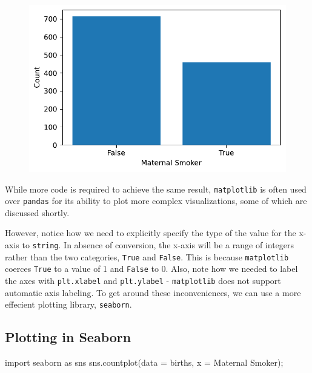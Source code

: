 \documentclass[
  letterpaper,
  DIV=11,
  numbers=noendperiod]{scrreprt}
\newenvironment{Shaded}{\begin{snugshade}}{\end{snugshade}}
\newcommand{\ImportTok}[1]{\textcolor[rgb]{0.00,0.46,0.62}{#1}}
\newcommand{\NormalTok}[1]{\textcolor[rgb]{0.00,0.23,0.31}{#1}}
\newcommand{\OperatorTok}[1]{\textcolor[rgb]{0.37,0.37,0.37}{#1}}
\newcommand{\StringTok}[1]{\textcolor[rgb]{0.13,0.47,0.30}{#1}}
\begin{document}
\begin{figure}[H]

{\centering \includegraphics{visualization_1/visualization_1_files/figure-pdf/cell-4-output-1.pdf}

}

\end{figure}

While more code is required to achieve the same result,
\texttt{matplotlib} is often used over \texttt{pandas} for its ability
to plot more complex visualizations, some of which are discussed
shortly.

However, notice how we need to explicitly specify the type of the value
for the x-axis to \texttt{string}. In absence of conversion, the x-axis
will be a range of integers rather than the two categories,
\texttt{True} and \texttt{False}. This is because \texttt{matplotlib}
coerces \texttt{True} to a value of 1 and \texttt{False} to 0. Also,
note how we needed to label the axes with \texttt{plt.xlabel} and
\texttt{plt.ylabel} - \texttt{matplotlib} does not support automatic
axis labeling. To get around these inconveniences, we can use a more
effecient plotting library, \texttt{seaborn}.

\hypertarget{plotting-in-seaborn}{%
\subsection{Plotting in Seaborn}\label{plotting-in-seaborn}}

\begin{Shaded}
\begin{Highlighting}[]
\ImportTok{import}\NormalTok{ seaborn }\ImportTok{as}\NormalTok{ sns}
\NormalTok{sns.countplot(data }\OperatorTok{=}\NormalTok{ births, x }\OperatorTok{=} \StringTok{\textquotesingle{}Maternal Smoker\textquotesingle{}}\NormalTok{)}\OperatorTok{;}
\end{Highlighting}
\end{Shaded}
\end{document}
